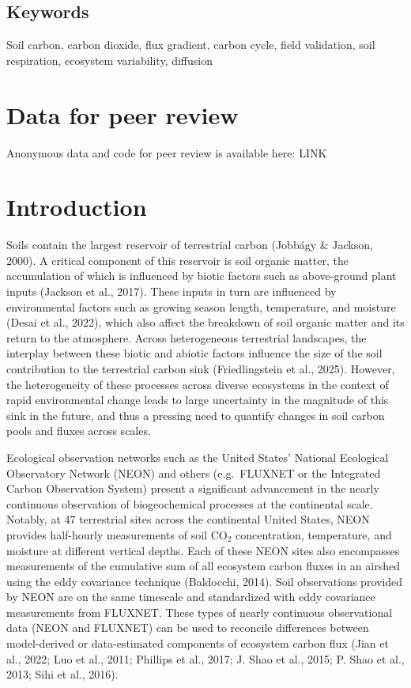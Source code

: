 \documentclass[
  letterpaper,
  DIV=11,
  numbers=noendperiod]{scrartcl}
\begin{document}
\subsection{Keywords}\label{keywords}

Soil carbon, carbon dioxide, flux gradient, carbon cycle, field
validation, soil respiration, ecosystem variability, diffusion

\section{Data for peer review}\label{data-for-peer-review}

Anonymous data and code for peer review is available here: LINK

\section{Introduction}\label{introduction}

Soils contain the largest reservoir of terrestrial carbon (Jobbágy \&
Jackson, 2000). A critical component of this reservoir is soil organic
matter, the accumulation of which is influenced by biotic factors such
as above-ground plant inputs (Jackson et al., 2017). These inputs in
turn are influenced by environmental factors such as growing season
length, temperature, and moisture (Desai et al., 2022), which also
affect the breakdown of soil organic matter and its return to the
atmosphere. Across heterogeneous terrestrial landscapes, the interplay
between these biotic and abiotic factors influence the size of the soil
contribution to the terrestrial carbon sink (Friedlingstein et al.,
2025). However, the heterogeneity of these processes across diverse
ecosystems in the context of rapid environmental change leads to large
uncertainty in the magnitude of this sink in the future, and thus a
pressing need to quantify changes in soil carbon pools and fluxes across
scales.

Ecological observation networks such as the United States' National
Ecological Observatory Network (NEON) and others (e.g.~FLUXNET or the
Integrated Carbon Observation System) present a significant advancement
in the nearly continuous observation of biogeochemical processes at the
continental scale. Notably, at 47 terrestrial sites across the
continental United States, NEON provides half-hourly measurements of
soil CO\(_{2}\) concentration, temperature, and moisture at different
vertical depths. Each of these NEON sites also encompasses measurements
of the cumulative sum of all ecosystem carbon fluxes in an airshed using
the eddy covariance technique (Baldocchi, 2014). Soil observations
provided by NEON are on the same timescale and standardized with eddy
covariance measurements from FLUXNET. These types of nearly continuous
observational data (NEON and FLUXNET) can be used to reconcile
differences between model-derived or data-estimated components of
ecosystem carbon flux (Jian et al., 2022; Luo et al., 2011; Phillips et
al., 2017; J. Shao et al., 2015; P. Shao et al., 2013; Sihi et al.,
2016).
\end{document}
